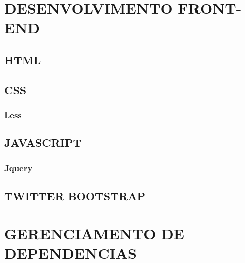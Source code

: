 \documentclass[12pt,floatnumber=continuous,espaco=umemeio]{abnt}
\begin{document}
 
	
	\capa 
	\folhaderosto 
	
	
  
	
	\indices

	
	
	
	
	
	
	
	
	
	\newpage
	
	\chapter{DESENVOLVIMENTO FRONT-END}
	\section{HTML}
	\section{CSS}
	\subsection{Less}
	\section{JAVASCRIPT}
	\subsection{Jquery}
	\section{TWITTER BOOTSTRAP}
	
	\chapter{GERENCIAMENTO DE DEPENDENCIAS}
\end{document}
